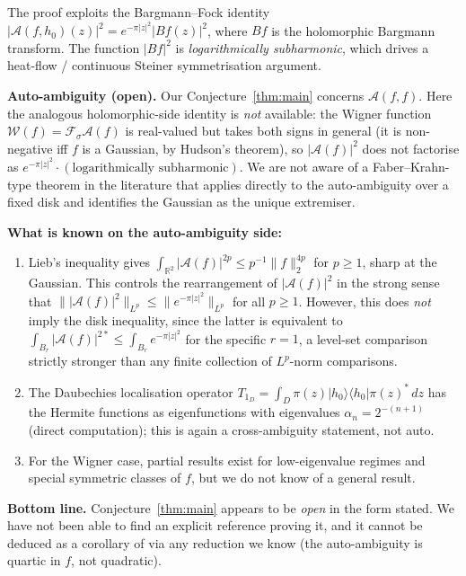 \documentclass[11pt]{article}
\theoremstyle{definition}
\newcommand{\R}{\mathbb{R}}
\newcommand{\Amb}{\mathcal{A}}
\newcommand{\Wig}{\mathcal{W}}
\newcommand{\norm}[1]{\lVert#1\rVert}
\begin{document}
The proof exploits the Bargmann--Fock identity
$|\Amb(f,h_{0})(z)|^{2}=e^{-\pi|z|^{2}}|Bf(z)|^{2}$, where $Bf$ is the
holomorphic Bargmann transform.  The function $|Bf|^{2}$ is
\emph{logarithmically subharmonic}, which drives a heat-flow / continuous
Steiner symmetrisation argument.

\smallskip
\noindent\textbf{Auto-ambiguity (open).}  Our Conjecture~\ref{thm:main}
concerns $\Amb(f,f)$.  Here the analogous holomorphic-side identity is
\emph{not} available: the Wigner function
$\Wig(f)=\mathcal{F}_{\sigma}\Amb(f)$ is real-valued but takes both signs
in general (it is non-negative iff $f$ is a Gaussian, by Hudson's theorem),
so $|\Amb(f)|^{2}$ does not factorise as $e^{-\pi|z|^{2}}\cdot(\text{logarithmically subharmonic})$.
We are not aware of a Faber--Krahn-type theorem in the literature that
applies directly to the auto-ambiguity over a fixed disk and identifies the
Gaussian as the unique extremiser.

\smallskip
\noindent\textbf{What is known on the auto-ambiguity side:}
\begin{enumerate}[label=(\alph*)]
  \item Lieb's inequality \cite{Lieb1990} gives
        $\int_{\R^{2}}|\Amb(f)|^{2p}\le p^{-1}\norm{f}_{2}^{4p}$ for
        $p\ge 1$, sharp at the Gaussian.  This controls the
        rearrangement of $|\Amb(f)|^{2}$ in the strong sense that
        $\norm{|\Amb(f)|^{2}}_{L^{p}}\le\norm{e^{-\pi|z|^{2}}}_{L^{p}}$
        for all $p\ge 1$.  However, this does \emph{not} imply the disk
        inequality, since the latter is equivalent to
        $\int_{B_{r}}|\Amb(f)|^{2*}\le\int_{B_{r}}e^{-\pi|z|^{2}}$ for the
        specific $r=1$, a level-set comparison strictly stronger than any
        finite collection of $L^{p}$-norm comparisons.
  \item The Daubechies localisation operator
        $T_{1_{D}}=\int_{D}\pi(z)|h_{0}\rangle\langle h_{0}|\pi(z)^{*}\,dz$
        has the Hermite functions as eigenfunctions with eigenvalues
        $\alpha_{n}=2^{-(n+1)}$ \textup{(}direct computation\textup{)}; this
        is again a cross-ambiguity statement, not auto.
  \item For the Wigner case, partial results exist for low-eigenvalue
        regimes and special symmetric classes of $f$, but we do not know
        of a general result.
\end{enumerate}

\smallskip
\noindent\textbf{Bottom line.}  Conjecture~\ref{thm:main} appears to be
\emph{open} in the form stated.  We have not been able to find an
explicit reference proving it, and it cannot be deduced as a corollary
of \cite{NicolaTilli2022STFT} via any reduction we know
\textup{(}the auto-ambiguity is quartic in $f$, not quadratic\textup{)}.
\end{document}
